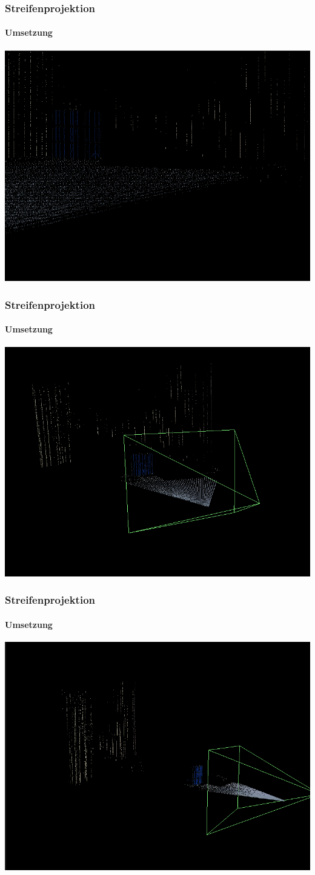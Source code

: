 \documentclass[xcolor=dvipsnames]{beamer}
\begin{document}
\begin{frame}
	\frametitle{Streifenprojektion}
	\framesubtitle{Umsetzung}
	\includegraphics[width=0.9\linewidth]{includes/3d_2.png}
\end{frame}
\begin{frame}
	\frametitle{Streifenprojektion}
	\framesubtitle{Umsetzung}
	\includegraphics[width=0.9\linewidth]{includes/3d_3.png}
\end{frame}
\begin{frame}
	\frametitle{Streifenprojektion}
	\framesubtitle{Umsetzung}
	\includegraphics[width=0.9\linewidth]{includes/3d_4.png}
\end{frame}
\end{document}
